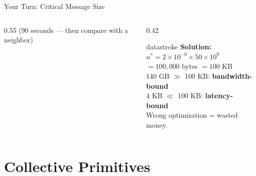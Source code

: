 \documentclass[aspectratio=169, 12pt]{beamer}
\begin{document}
\begin{frame}{Your Turn: Critical Message Size}
\begin{columns}[T]
\begin{column}{0.55\textwidth}
    {\footnotesize\textcolor{midgray}{(90 seconds --- then compare with a neighbor)}}
  \end{column}
  \begin{column}{0.42\textwidth}
    \pause
    \begin{mlsyscard}{datastroke}
    \textbf{Solution:}\\[0.1cm]
    {\footnotesize
    $n^* = 2 \times 10^{-6} \times 50 \times 10^{9}$\\
    $= 100{,}000$ bytes $= 100$ KB\\[0.1cm]
    140 GB $\gg$ 100 KB: \textcolor{datastroke}{\textbf{bandwidth-bound}}\\
    4 KB $\ll$ 100 KB: \textcolor{errorstroke}{\textbf{latency-bound}}\\[0.1cm]
    Wrong optimization = wasted money.
    }
    \end{mlsyscard}
  \end{column}
\end{columns}

\end{frame}

\section{Collective Primitives}
\end{document}
